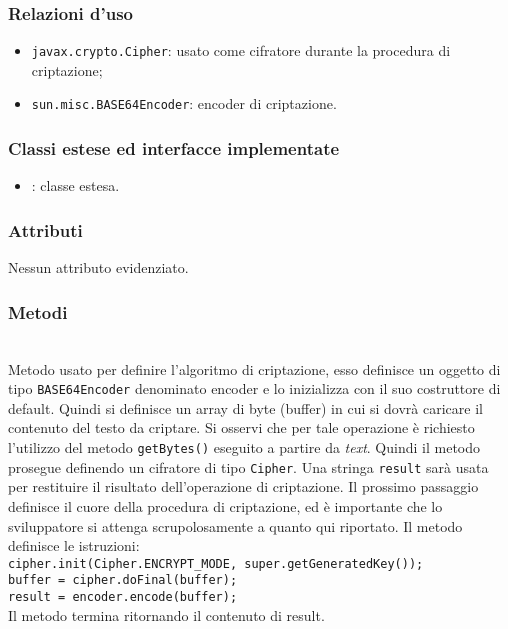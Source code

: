 \subsubsection*{Relazioni d'uso}
\begin{itemize}
	\item \texttt{javax.crypto.Cipher}: usato come cifratore durante la procedura di criptazione;
	\item \texttt{sun.misc.BASE64Encoder}: encoder di criptazione.
\end{itemize}

\subsubsection*{Classi estese ed interfacce implementate}

\begin{itemize}
	\item {}: classe estesa.
\end{itemize}

\subsubsection*{Attributi}

Nessun attributo evidenziato.

\subsubsection*{Metodi}
\begin{description}

	\item{}\\
	Metodo usato per definire l'algoritmo di criptazione, esso definisce un oggetto di tipo \texttt{BASE64Encoder} denominato encoder e lo inizializza con il suo costruttore di default. Quindi si definisce un array di byte (buffer) in cui si dovrà caricare il contenuto del testo da criptare. Si osservi che per tale operazione è richiesto l'utilizzo del metodo \texttt{getBytes()} eseguito a partire da \textit{text}. Quindi il metodo prosegue definendo  un cifratore di tipo \texttt{Cipher}. Una stringa \texttt{result} sarà usata per restituire il risultato dell'operazione di criptazione. Il prossimo passaggio definisce il cuore della procedura di criptazione, ed è importante che lo sviluppatore si attenga scrupolosamente a quanto qui riportato. Il metodo definisce le istruzioni:\\
	
	\verb|cipher.init(Cipher.ENCRYPT_MODE, super.getGeneratedKey());|\\
	\verb|buffer = cipher.doFinal(buffer);|\\
	\verb|result = encoder.encode(buffer);|\\
	
	Il metodo termina ritornando il contenuto di result.
	
\end{description}

